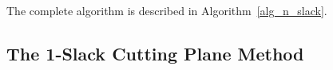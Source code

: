 The complete algorithm is described in Algorithm~\ref{alg_n_slack}.




\subsection{The 1-Slack Cutting Plane Method}

